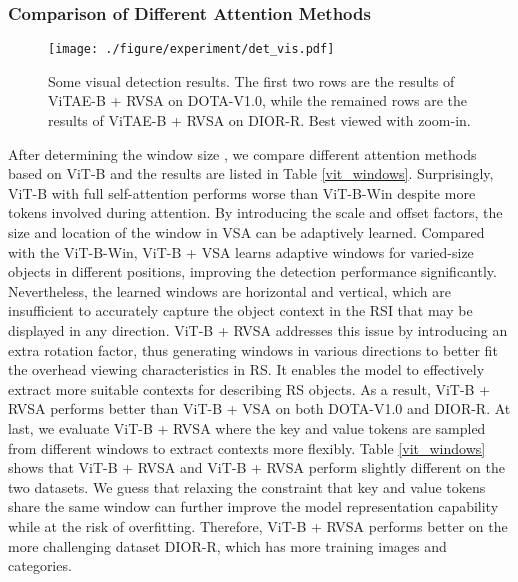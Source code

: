 \documentclass[10pt, journal,twoside]{IEEEtran}
\begin{document}
\subsubsection{Comparison of Different Attention Methods}

\begin{figure*}[t]
  \centering
  \texttt{[image: ./figure/experiment/det\_vis.pdf]}\\
  \caption{Some visual detection results. The first two rows are the results of ViTAE-B + RVSA on DOTA-V1.0, while the remained rows are the results of ViTAE-B + RVSA on DIOR-R. Best viewed with zoom-in. 
  }
  \label{det_vis}
\end{figure*}

\label{subsubsec:attentioncomparison}
After determining the window size , we compare different attention methods based on ViT-B and the results are listed in Table \ref{vit_windows}. Surprisingly, ViT-B with full self-attention performs worse than ViT-B-Win despite more tokens involved during attention. By introducing the scale and offset factors, the size and location of the window in VSA can be adaptively learned. Compared with the ViT-B-Win, ViT-B + VSA learns adaptive windows for varied-size objects in different positions, improving the detection performance significantly. Nevertheless, the learned windows are horizontal and vertical, which are insufficient to accurately capture the object context in the RSI that may be displayed in any direction. ViT-B + RVSA addresses this issue by introducing an extra rotation factor, thus generating windows in various directions to better fit the overhead viewing characteristics in RS. It enables the model to effectively extract more suitable contexts for describing RS objects. As a result, ViT-B + RVSA performs better than ViT-B + VSA on both DOTA-V1.0 and DIOR-R. At last, we evaluate ViT-B + RVSA where the key and value tokens are sampled from different windows to extract contexts more flexibly. Table \ref{vit_windows} shows that ViT-B + RVSA and ViT-B + RVSA perform slightly different on the two datasets. We guess that relaxing the constraint that key and value tokens share the same window can further improve the model representation capability while at the risk of overfitting. Therefore, ViT-B + RVSA performs better on the more challenging dataset DIOR-R, which has more training images and categories.
\end{document}
